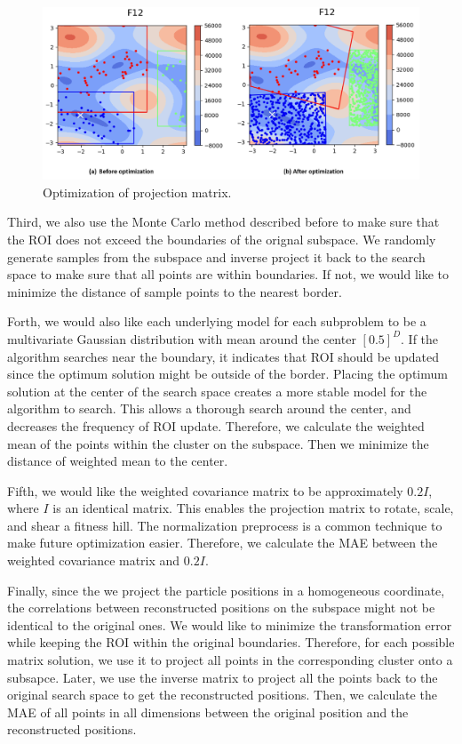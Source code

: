 \begin{figure}
\centering
\includegraphics[width=\textwidth]{Sample_projection}
\caption{Optimization of projection matrix.}\label{fig:Sample_projection}
\end{figure}

Third, we also use the Monte Carlo method described before to make sure that the ROI does not exceed the boundaries of the orignal subspace.
We randomly generate samples from the subspace and inverse project it back to the search space to make sure that all points are within boundaries.
If not, we would like to minimize the distance of sample points to the nearest border.

Forth, we would also like each underlying model for each subproblem 
to be a multivariate Gaussian distribution with mean around the center $[0.5]^D$.
If the algorithm searches near the boundary, it indicates that ROI should be updated since the optimum solution might be outside of the border.
Placing the optimum solution at the center of the search space creates a more stable model for the algorithm to search.
This allows a thorough search around the center, and decreases the frequency of ROI update.
Therefore, we calculate the weighted mean of the points within the cluster on the subspace.
Then we minimize the distance of weighted mean to the center.  

Fifth, we would like the weighted covariance matrix to be approximately $0.2I$, where $I$ is an identical matrix.
This enables the projection matrix to rotate, scale, and shear a fitness hill.
The normalization preprocess is a common technique to make future optimization easier.
Therefore, we calculate the MAE between the weighted covariance matrix and $0.2I$.  

Finally, since the we project the particle positions in a homogeneous coordinate,
the correlations between reconstructed positions on the subspace might not be identical to the original ones.
We would like to minimize the transformation error while keeping the ROI within the original boundaries.
Therefore, for each possible matrix solution, we use it to project all points in the corresponding cluster onto a subsapce.
Later, we use the inverse matrix to project all the points back to the original search space to get the reconstructed positions.
Then, we calculate the MAE of all points in all dimensions between the original position and the reconstructed positions.


